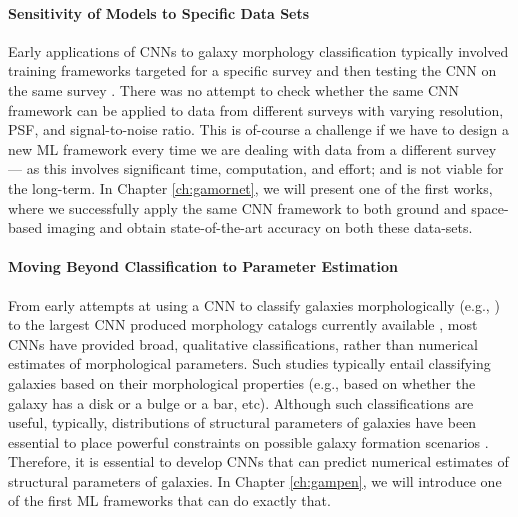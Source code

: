 \paragraph{Sensitivity of Models to Specific Data Sets} Early applications of CNNs to galaxy morphology classification typically involved training frameworks  targeted for a specific survey and then testing the CNN on the same survey \citep[e.g.,]{Dieleman2015Rotation-invariantPrediction, Huertas-Company2015ALEARNING, Tuccillo2018DeepFitting}. There was no attempt to check whether the same CNN framework can be applied to data from different surveys with varying resolution, PSF, and signal-to-noise ratio. This is of-course a challenge if we have to design a new ML framework every time we are dealing with data from a different survey --- as this involves significant time, computation, and effort; and is not viable for the long-term. In Chapter \ref{ch:gamornet}, we will present one of the first works, where we successfully apply the same CNN framework to both ground and space-based imaging and obtain state-of-the-art accuracy on both these data-sets. 

\paragraph{Moving Beyond Classification to Parameter Estimation} From early attempts at using a CNN to classify galaxies morphologically (e.g.,  \citealp{Dieleman2015Rotation-invariantPrediction}) to the largest CNN produced morphology catalogs currently available \citep{Cheng2021GalaxyNetworks, Vega-Ferrero2021PushingSurvey}, most CNNs have provided broad, qualitative classifications, rather than 
numerical estimates of morphological parameters. Such studies typically entail classifying galaxies based on their morphological properties (e.g., based on whether the galaxy has a disk or a bulge or a bar, etc). Although such classifications are useful, typically, distributions of structural parameters of galaxies have been essential to place powerful constraints on possible galaxy formation scenarios \citep[e.g.,][]{Kauffmann2004TheGalaxies,Weinmann2006PropertiesMass,Schawinski2007TheGalaxies,vanderWel2008TheMass,Schawinski2014TheGalaxies}. Therefore, it is essential to develop CNNs that can predict numerical estimates of structural parameters of galaxies. In Chapter \ref{ch:gampen}, we will introduce one of the first ML frameworks that can do exactly that. 

